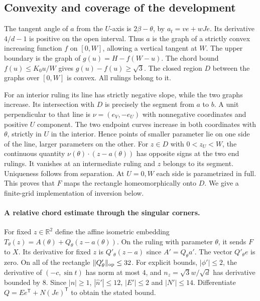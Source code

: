 \documentclass[10pt,letterpaper]{article}
\newcommand{\R}{\mathbb R}\newcommand{\norm}[1]{\left\lVert#1\right\rVert}
\begin{document}
\subsection*{Convexity and coverage of the development}
The tangent angle of $a$ from the $U$-axis is $2\beta-\theta$, by $a_t=ve+wJe$. Its derivative $4/d-1$ is positive on the open interval. Thus $a$ is the graph of a strictly convex increasing function $f$ on $[0,W]$, allowing a vertical tangent at $W$. The upper boundary is the graph of $g(u)=H-f(W-u)$. The chord bound $f(u)\le K_0u/W$ gives $g(u)-f(u)\ge\sqrt3$. The closed region $D$ between the graphs over $[0,W]$ is convex. All rulings belong to it.
\par For an interior ruling its line has strictly negative slope, while the two graphs increase. Its intersection with $D$ is precisely the segment from $a$ to $b$. A unit perpendicular to that line is $\nu=(e_V,-e_U)$ with nonnegative coordinates and positive $U$ component. The two endpoint curves increase in both coordinates with $\theta$, strictly in $U$ in the interior. Hence points of smaller parameter lie on one side of the line, larger parameters on the other. For $z\in D$ with $0<z_U<W$, the continuous quantity $\nu(\theta)\cdot(z-a(\theta))$ has opposite signs at the two end rulings. It vanishes at an intermediate ruling and $z$ belongs to its segment. Uniqueness follows from separation. At $U=0,W$ each side is parametrized in full. This proves that $F$ maps the rectangle homeomorphically onto $D$. We give a finite-grid implementation of inversion below.
\paragraph{A relative chord estimate through the singular corners.}
For fixed $z\in\R^2$ define the affine isometric embedding
$T_\theta(z)=A(\theta)+Q_\theta(z-a(\theta))$. On the ruling with parameter $\theta$, it sends $F$ to $X$. Its derivative for fixed $z$ is $Q'_\theta(z-a)$ since $A'=Q_\theta a'$. The vector $Q'_\theta e$ is zero. On all of the rectangle $\|Q'_\theta\|_{\rm op}\le32$. For explicit bounds, $|\phi'|\le2$, the derivative of $(-c,\sin t)$ has norm at most $4$, and $n_z=\sqrt3 w/\sqrt d$ has derivative bounded by $8$. Since $|n|\ge1$, $|\widehat n'|\le12$, $|E'|\le2$ and $|N'|\le14$. Differentiate $Q=Ee^{\mathsf T}+N(Je)^{\mathsf T}$ to obtain the stated bound.
\end{document}

